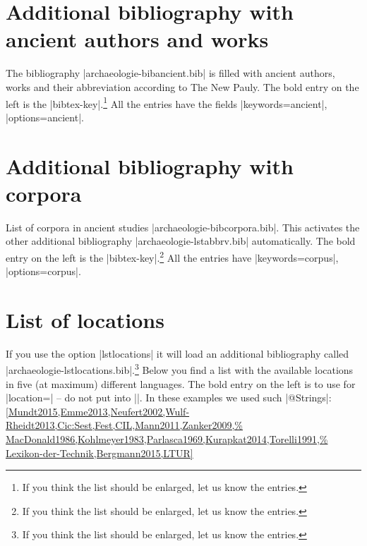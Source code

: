 \documentclass[a4paper,
10pt,
greek,
french,
spanish,
italian,
ngerman,
english,
]{ltxdoc}
\begin{document}
\section{Additional bibliography with ancient authors and works}\label{list-bibancient}
The bibliography |archaeologie-bibancient.bib| is filled with ancient authors, works and their abbreviation according to  The New Pauly.
The bold entry on the left is the |bibtex-key|.\footnote{If you think the list should be enlarged, let us know the entries.}
All the entries have the fields  |keywords={ancient}|, |options={ancient}|.

\begin{multicols}{2}
  
\end{multicols}


\section{Additional bibliography with corpora}\label{list-bibcorpora}
List of corpora in ancient studies |archaeologie-bibcorpora.bib|.
This activates the other additional bibliography |archaeologie-lstabbrv.bib| automatically.
The bold entry on the left is the |bibtex-key|.\footnote{If you think the list should be enlarged, let us know the entries.}
All the entries have |keywords={corpus}|, |options={corpus}|.
\begin{multicols}{2}
  
\end{multicols}

\section{List of locations}\label{list-locations}
If you use the option |lstlocations| it will load an additional bibliography called |archaeologie-lstlocations.bib|.\footnote{If you think the list should be enlarged, let us know the entries.} 
Below you find a list with the available locations in five (at maximum) different languages.
The bold entry on the left is to use for |location=| -- do not put  into |{}|.
In these examples we used such |@Strings|:
\cref{Mundt2015,Emme2013,Neufert2002,Wulf-Rheidt2013,Cic:Sest,Fest,CIL,Mann2011,Zanker2009,%
MacDonald1986,Kohlmeyer1983,Parlasca1969,Kurapkat2014,Torelli1991,%
Lexikon-der-Technik,Bergmann2015,LTUR}
\end{document}
